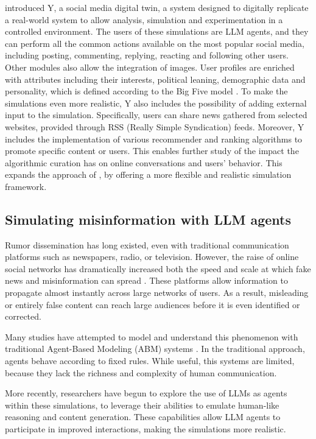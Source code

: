 \medskip
\citet{rossetti2024ysocialllmpoweredsocial} introduced Y, a social media digital twin, a system designed to digitally replicate a real-world system to allow analysis, simulation and experimentation in a controlled environment.
The users of these simulations are LLM agents, and they can perform all the common actions available on the most popular social media, including posting, commenting, replying, reacting and following other users. Other modules also allow the integration of images.
User profiles are enriched with attributes including their interests, political leaning, demographic data and personality, which is defined according to the Big Five model \cite{barrick1991bigfive, McCrae1992}.
To make the simulations even more realistic, Y also includes the possibility of adding external input to the simulation. Specifically, users can share news gathered from selected websites, provided through RSS (Really Simple Syndication) feeds.
Moreover, Y includes the implementation of various recommender and ranking algorithms to promote specific content or users. This enables further study of the impact the algorithmic curation has on online conversations and users' behavior. This expands the approach of \citet{törnberg2023evaluate}, by offering a more flexible and realistic simulation framework.



\subsection{Simulating misinformation with LLM agents}
Rumor dissemination has long existed, even with traditional communication platforms such as newspapers, radio, or television. However, the raise of online social networks has dramatically increased both the speed and scale at which fake news and misinformation can spread \cite{aimeur2023fake}. These platforms allow information to propagate almost instantly across large networks of users. As a result, misleading or entirely false content can reach large audiences before it is even identified or corrected.

\medskip
Many studies have attempted to model and understand this phenomenon with traditional Agent-Based Modeling (ABM) systems \cite{gausen2021can, sulis2020, muhammad2024agent}. In the traditional approach, agents behave according to fixed rules. While useful, this systems are limited, because they lack the richness and complexity of human communication. 

\medskip
More recently, researchers have begun to explore the use of LLMs as agents within these simulations, to leverage their abilities to emulate human-like reasoning and content generation.
These capabilities allow LLM agents to participate in improved interactions, making the simulations more realistic.


